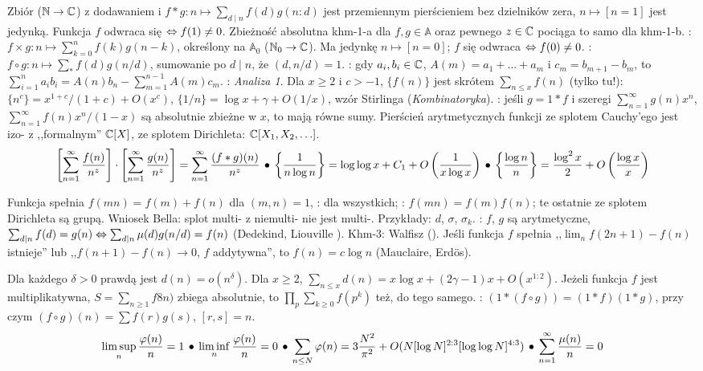 Zbiór   ($\mathbb N \to \mathbb{C}$) %
z dodawaniem i  $f*g \colon n \mapsto \sum_{d \mid n} f(d) g(n : d)$ jest przemiennym pierścieniem bez dzielników zera, $n \mapsto [n=1]$ jest jedynką.
Funkcja $f$ odwraca się $\Leftrightarrow f(1) \neq 0$.
Zbieżność absolutna khm-1-a dla $f, g \in \mathbb A$ oraz pewnego $z \in \mathbb{C}$ pociąga to samo dla khm-1-b.
: $f \times g \colon n \mapsto \sum_{k=0}^n f(k)g(n-k)$, określony na $\mathbb A_0$ ($\mathbb N_0 \to \mathbb{C}$).
Ma jedynkę $n \mapsto [n = 0]$; $f$ się odwraca $\Leftrightarrow f(0) \neq 0$.
: $f \circ g \colon n \mapsto \sum_* f(d) g(n/d)$, sumowanie po $d \mid n$, że $(d, n/d) = 1$.
: gdy $a_i, b_i \in \mathbb{C}$, $A(m) = a_1 + \ldots + a_m$ i $c_m = b_{m+1} - b_m$, to $\sum_{i=1}^n a_i b_i = A(n) b_n - \sum_{m=1}^{n-1} A(m) c_m$.
: \emph{Analiza 1}.
Dla $x \ge 2$ i $c > -1$, $\{f(n)\}$ jest skrótem $\sum_{n \le x} f(n)$ (tylko tu!): $\{n^c\} = x^{1+c}/(1+c) + O(x^c)$, $\{1/n\} = \log x + \gamma + O(1/x)$, wzór Stirlinga (\emph{Kombinatoryka}).
: jeśli $g = 1 * f$ i szeregi $\sum_{n=1}^\infty g(n) x^n$, $\sum_{n=1}^\infty f(n) x^n / (1-x)$ są absolutnie zbieżne w $x$, to mają równe sumy.
Pierścień arytmetycznych funkcji ze splotem Cauchy'ego jest izo- z ,,formalnym'' $\mathbb{C}[X]$, ze splotem Dirichleta: $\mathbb{C}[X_1, X_2, \ldots]$.
\[
	\left[\sum_{n=1}^\infty \frac{f(n)}{n^z} \right] \cdot \left[\sum_{n=1}^\infty \frac{g(n)}{n^z} \right] = \sum_{n=1}^\infty \frac{(f*g)(n)}{n^z} \, \bullet \,
	\left\{\frac{1}{n \log n}\right\} = \log \log x + C_1 + O \left( \frac{1}{x \log x}\right) \, \bullet \,
	\left\{\frac{\log n}{n}\right\} = \frac{\log^2 x}{2} + O \left(\frac{\log x}{x}\right)
\]

Funkcja   spełnia $f(mn) = f(m) + f(n)$ dla $(m,n) = 1$, : dla wszystkich; : $f(mn) = f(m) f(n)$; te ostatnie ze splotem Dirichleta są grupą.
Wniosek Bella: splot multi- z niemulti- nie jest multi-.
Przykłady: $d$, $\sigma$, $\sigma_k$.
: $f$, $g$ są arytmetyczne, $\sum_{d \mid n} f(d) = g(n) \Leftrightarrow \sum_{d\mid n} \mu (d) g(n/d) = f(n)$ (Dedekind, Liouville ).
Khm-3: Walfisz ().
Jeśli funkcja $f$ spełnia ,,$\lim_n f(2n+1) - f(n)$ istnieje'' lub ,,$f(n+1) - f(n) \to 0$, $f$ addytywna'', to $f(n) = c \log n$ (Mauclaire, Erdös).

Dla każdego $\delta > 0$ prawdą jest $d(n) = o(n^\delta)$.
Dla $x \ge 2$, $\sum_{n \le x} d(n) = x \log x + (2\gamma - 1) x + O(x^{1:2})$.
Jeżeli funkcja $f$ jest multiplikatywna, $S = \sum_{n \ge 1} f8n)$ zbiega absolutnie, to $\prod_p \sum_{k \ge 0} f(p^k)$ też, do tego samego.
: $(1 * (f \circ g)) = (1 * f)(1 * g)$, przy czym $(f \circ g)(n) = \sum f(r)g(s)$, $[r, s] = n$.
\[
	\limsup_n \frac{\varphi(n)}{n} = 1 \, \bullet \,
	\liminf_n \frac{\varphi(n)}{n} = 0 \, \bullet \,
	\sum_{n \le N} \varphi(n) = 3 \frac{N^2}{\pi^2} + O(N [\log N]^{2:3} [\log \log N]^{4:3}) \, \bullet \,
	\sum_{n=1}^\infty \frac{\mu(n)}{n} = 0
\]


